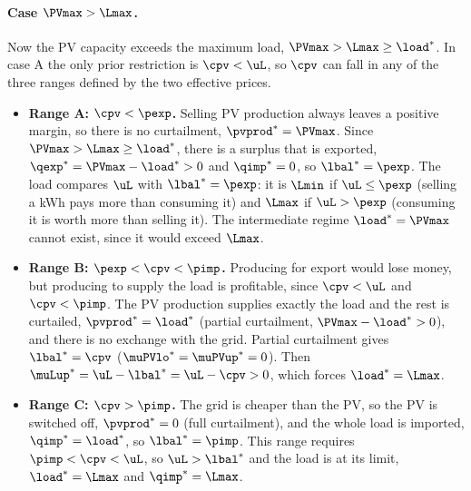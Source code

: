 \paragraph{Case $\PVmax > \Lmax$.}
Now the PV capacity exceeds the maximum load, $\PVmax > \Lmax \geq {\load}^*$. In case A the
only prior restriction is $\cpv < \uL$, so $\cpv$ can fall in any of the three ranges defined
by the two effective prices.
\begin{itemize}
    \item \textbf{Range A: $\cpv < \pexp$.} Selling PV production always leaves a positive
    margin, so there is no curtailment, ${\pvprod}^* = \PVmax$. Since
    $\PVmax > \Lmax \geq {\load}^*$, there is a surplus that is exported,
    ${\qexp}^* = \PVmax - {\load}^* > 0$ and ${\qimp}^* = 0$, so ${\lbal}^* = \pexp$. The load
    compares $\uL$ with ${\lbal}^* = \pexp$: it is $\Lmin$ if $\uL \leq \pexp$ (selling a kWh
    pays more than consuming it) and $\Lmax$ if $\uL > \pexp$ (consuming it is worth more than
    selling it). The intermediate regime ${\load}^* = \PVmax$ cannot exist, since it would
    exceed $\Lmax$.
    \item \textbf{Range B: $\pexp < \cpv < \pimp$.} Producing for export would lose money, but
    producing to supply the load is profitable, since $\cpv < \uL$ and $\cpv < \pimp$. The PV
    production supplies exactly the load and the rest is curtailed,
    ${\pvprod}^* = {\load}^*$ (partial curtailment, $\PVmax - {\load}^* > 0$), and there is no
    exchange with the grid. Partial curtailment gives ${\lbal}^* = \cpv$
    (${\muPVlo}^* = {\muPVup}^* = 0$). Then ${\muLup}^* = \uL - {\lbal}^* = \uL - \cpv > 0$,
    which forces ${\load}^* = \Lmax$.
    \item \textbf{Range C: $\cpv > \pimp$.} The grid is cheaper than the PV, so the PV is
    switched off, ${\pvprod}^* = 0$ (full curtailment), and the whole load is imported,
    ${\qimp}^* = {\load}^*$, so ${\lbal}^* = \pimp$. This range requires
    $\pimp < \cpv < \uL$, so $\uL > {\lbal}^*$ and the load is at its limit,
    ${\load}^* = \Lmax$ and ${\qimp}^* = \Lmax$.
\end{itemize}

